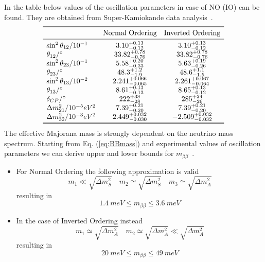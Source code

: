 \documentclass{subnucbo}
\begin{document}
In the table below values of the oscillation parameters in case of NO (IO) can be found. They are obtained from Super-Kamiokande data analysis~\cite[p.~38]{ref:pdg}. 
\[
\begin{array}{lcc}
\toprule
&\text{Normal Ordering}&\text{Inverted Ordering}\\
\midrule
\sin^2\theta_{12}/10^{-1}&3.10_{-0.12}^{+0.13}&3.10_{-0.12}^{+0.13}\\
\theta_{12}/\si{\degree}&33.82_{-0.76}^{+0.78}&33.82_{-0.76}^{+0.78}\\
\sin^2\theta_{23}/10^{-1}&5.58_{-0.33}^{+0.20}&5.63_{-0.26}^{+0.19}\\
\theta_{23}/\si{\degree}&48.3_{-1.9}^{+1.2}&48.6_{-1.5}^{+1.1}\\
\sin^2\theta_{13}/10^{-2}&2.241_{-0.065}^{+0.066}&2.261_{-0.064}^{+0.067}\\
\theta_{13}/\si{\degree}&8.61_{-0.13}^{+0.13}&8.65_{-0.12}^{+0.13}\\
\delta_{CP}/\si{\degree}&222_{-28}^{+38}&285_{-26}^{+24}\\
\Delta m^2_{21}/10^{-5}eV^2&7.39_{-0.20}^{+0.21}&7.39_{-0.20}^{+0.21}\\
\Delta m_{32}^2/10^{-3}eV^2&2.449_{-0.030}^{+0.032}&-2.509_{-0.032}^{+0.032}\\
\bottomrule
\end{array}
\]
The effective Majorana mass is strongly dependent on the neutrino mass spectrum. Starting from Eq. (\ref{eq:BBmass}) and experimental values of oscillation parameters we can derive upper and lower bounds for $m_{\beta\beta}$~\cite{ref:ver}.
\begin{itemize}
\item For Normal Ordering the following approximation is valid
	\begin{equation}
	m_1\ll\sqrt{\Delta m_S^2} \quad m_2\simeq\sqrt{\Delta m_S^2} \quad m_3\simeq\sqrt{\Delta m_A^2}
	\end{equation}
	resulting in 
	\begin{equation}
	\SI{1.4}{meV} \leq m_{\beta\beta} \leq \SI{3.6}{meV}
	\end{equation}
\item In the case of Inverted Ordering instead
	\begin{equation}
	m_1\simeq\sqrt{\Delta m_A^2} \quad m_2\simeq\sqrt{\Delta m_A^2} \ll\sqrt{\Delta m_A^2}
	\end{equation}
	resulting in
	\begin{equation}
	\SI{20}{meV}\leq m_{\beta\beta} \leq \SI{49}{meV}
	\end{equation}
\end{itemize}
\end{document}
